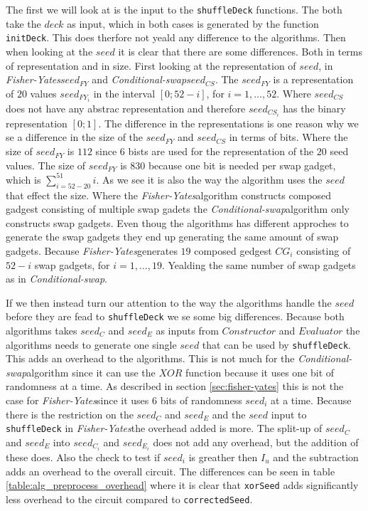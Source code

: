 \documentclass[twoside,11pt,openright]{report}
\newcommand{\FY}{\textit{Fisher-Yates}}
\newcommand{\CS}{\textit{Conditional-swap}}
\begin{document}
\bigskip

The first we will look at is the input to the \verb|shuffleDeck| functions. The both take the $deck$ as input, which in both cases is generated by the function \verb|initDeck|. This does therfore not yeald any difference to the algorithms. Then when looking at the $seed$ it is clear that there are some differences. Both in terms of representation and in size. First looking at the representation of $seed$, in \FY $seed_{FY}$ and \CS $seed_{CS}$. The $seed_{FY}$ is a representation of $20$ values $seed_{FY_i}$ in the interval $[0;52-i]$, for $i=1,\dots, 52$. Where $seed_{CS}$ does not have any abstrac representation and therefore $seed_{CS_i}$ has the binary representation $[0;1]$. The difference in the representations is one reason why we se a difference in the size of the $seed_{FY}$ and $seed_{CS}$ in terms of bits. Where the size of $seed_{FY}$ is $112$ since $6$ bists are used for the representation of the $20$ seed values. The size of $seed_{FY}$ is $830$ because one bit is needed per swap gadget, which is $\sum_{i=52-20}^{51} i$. As we see it is also the way the algorithm uses the $seed$ that effect the size. Where the \FY algorithm constructs composed gadgest consisting of multiple swap gadets the \CS algorithm only constructs swap gadgets. Even thoug the algorithms has different approches to generate the swap gadgets they end up generating the same amount of swap gadgets. Because \FY generates $19$ composed gedgest $CG_i$ consisting of $52-i$ swap gadgets, for $i=1,\dots,19$. Yealding the same number of swap gadgets as in \CS .

If we then instead turn our attention to the way the algorithms handle the $seed$ before they are fead to \verb|shuffleDeck| we se some big differences. Because both algorithms takes $seed_C$ and $seed_E$ as inputs from $Constructor$ and $Evaluator$ the algorithms needs to generate one single $seed$ that can be used by \verb|shuffleDeck|. This adds an overhead to the algorithms. This is not much for the \CS algorithm since it can use the $XOR$ function because it uses one bit of randomness at a time. As described in section \ref{sec:fisher-yates} this is not the case for \FY since it uses $6$ bits of randomness $seed_i$ at a time. Because there is the restriction on the $seed_C$ and $seed_E$ and the $seed$ input to \verb|shuffleDeck| in \FY the overhead added is more. The split-up of $seed_C$ and $seed_E$ into $seed_{C_i}$ and $seed_{E_i}$ does not add any overhead, but the addition of these does. Also the check to test if $seed_i$ is greather then $I_u$ and the subtraction adds an overhead to the overall circuit. The differences can be seen in table \ref{table:alg_preprocess_overhead} where it is clear that \verb|xorSeed| adds significantly less overhead to the circuit compared to \verb|correctedSeed|. 
\end{document}
